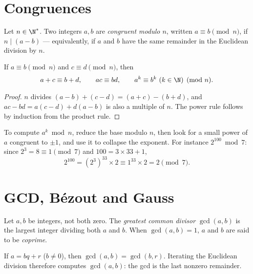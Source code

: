 \section{Congruences}

\begin{definition}[Congruence]\label{def:tle:arith:congruence}
Let $n \in \N^*$. Two integers $a, b$ are \emph{congruent modulo
$n$}, written $a \equiv b \pmod n$, if $n \mid (a - b)$
--- equivalently, if $a$ and $b$ have the same remainder in the Euclidean
division by $n$.
\end{definition}

\begin{proposition}\label{prop:tle:arith:congops}
If $a \equiv b \pmod n$ and $c \equiv d \pmod n$, then
\[
a + c \equiv b + d, \qquad
ac \equiv bd, \qquad
a^k \equiv b^k \ (k \in \N) \pmod n .
\]
\end{proposition}

\begin{proof}
$n$ divides $(a-b) + (c-d) = (a+c) - (b+d)$, and
$ac - bd = a(c - d) + d(a - b)$ is also a multiple of $n$. The power rule
follows by induction from the product rule.
\end{proof}

\begin{method}\label{met:tle:arith:powers}
To compute $a^k \bmod n$, reduce the base modulo $n$, then look for a small
power of $a$ congruent to $\pm1$, and use it to collapse the exponent. For
instance $2^{100} \bmod 7$: since $2^3 = 8 \equiv 1 \pmod 7$ and
$100 = 3\times33 + 1$,
\[
2^{100} = \left(2^{3}\right)^{33} \times 2 \equiv 1^{33}\times 2 = 2 \pmod 7 .
\]
\end{method}

\section{GCD, Bézout and Gauss}

\begin{definition}[GCD]\label{def:tle:arith:gcd}
Let $a, b$ be integers, not both zero. The \emph{greatest common
divisor} $\gcd(a, b)$ is the largest integer dividing both $a$
and $b$. When $\gcd(a,b) = 1$, $a$ and $b$ are said to be
\emph{coprime}.
\end{definition}

\begin{proposition}\label{prop:tle:arith:euclidalgo}
If $a = bq + r$ ($b \neq 0$), then $\gcd(a, b) = \gcd(b, r)$. Iterating the
Euclidean division therefore computes $\gcd(a,b)$: the gcd is the last
nonzero remainder.
\end{proposition}

